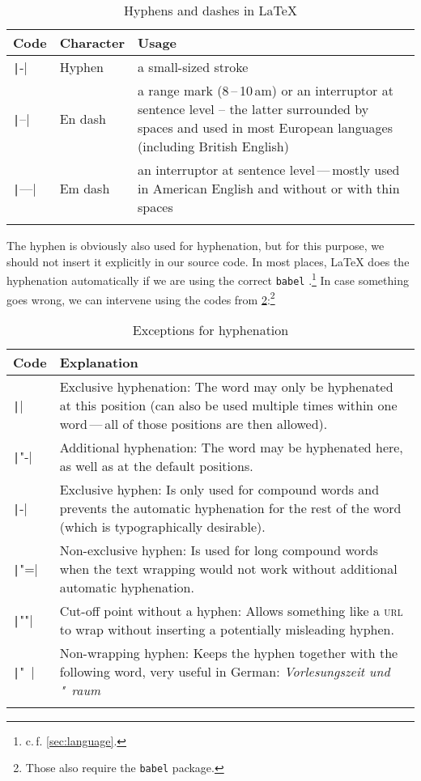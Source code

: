 \begin{longtable}{@{}llp{7.8cm}@{}}
	\toprule
	Code       & Character            & Usage \\
	\midrule
	\texttt|-|   & Hyphen  & a small-sized stroke \\
	\texttt|--|  & En dash & a range mark (8\,--\,10\,am) or an interruptor at sentence level – the latter surrounded by spaces and used in most European languages (including British English) \\
	\texttt|---| & Em dash & an interruptor at sentence level\,---\,mostly used in American English and without or with thin spaces \\
	\bottomrule
	\caption{Hyphens and dashes in \LaTeX}
	\label{tbl:bars}
\end{longtable}

The hyphen is obviously also used for hyphenation, but for this purpose, we should not insert it explicitly in our source code.
In most places, \LaTeX{} does the hyphenation automatically if we are using the correct \texttt{babel} .\footnote{c.\,f. \cref{sec:language}.}
In case something goes wrong, we can intervene using the codes from \cref{tbl:separators}:\footnote{Those also require the \texttt{babel} package.}

\begin{longtable}{@{}lp{11cm}@{}}
	\toprule
	Code      & Explanation \\
	\midrule
	\endhead
	\texttt|\-| & Exclusive hyphenation: The word may only be hyphenated at this position (can also be used multiple times within one word\,---\,all of those positions are then allowed). \\
	\texttt|"-| & Additional hyphenation: The word may be hyphenated here, as well as at the default positions. \\
	\texttt|-|  & Exclusive hyphen: Is only used for compound words and prevents the automatic hyphenation for the rest of the word (which is typographically desirable). \\
	\texttt|"=| & Non-exclusive hyphen: Is used for long compound words when the text wrapping would not work without additional automatic hyphenation. \\
	\texttt|""| & Cut-off point without a hyphen: Allows something like a \textsc{url} to wrap without inserting a potentially misleading hyphen. \\
	\texttt|"~| & Non-wrapping hyphen: Keeps the hyphen together with the following word, very useful in German: \foreignlanguage{ngerman}{\emph{Vorlesungszeit und "~raum}} \\
	\bottomrule
	\caption{Exceptions for hyphenation}
	\label{tbl:separators}
\end{longtable}

